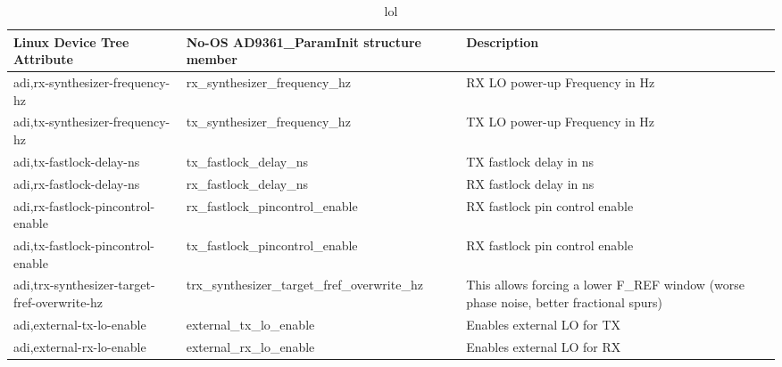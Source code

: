 \begin{table}[]
\centering
\begin{adjustbox}{width=1\textwidth}
\label{my-label}
\begin{tabular}{|l|l|l|}
\hline
\textbf{Linux Device Tree Attribute}         & \textbf{No-OS AD9361\_ParamInit structure member} & \textbf{Description}                                                                   \\ \hline
adi,rx-synthesizer-frequency-hz              & rx\_synthesizer\_frequency\_hz                    & RX LO power-up Frequency in Hz                                                         \\ \hline
adi,tx-synthesizer-frequency-hz              & tx\_synthesizer\_frequency\_hz                    & TX LO power-up Frequency in Hz                                                         \\ \hline
adi,tx-fastlock-delay-ns                     & tx\_fastlock\_delay\_ns                           & TX fastlock delay in ns                                                                \\ \hline
adi,rx-fastlock-delay-ns                     & rx\_fastlock\_delay\_ns                           & RX fastlock delay in ns                                                                \\ \hline
adi,rx-fastlock-pincontrol-enable            & rx\_fastlock\_pincontrol\_enable                  & RX fastlock pin control enable                                                         \\ \hline
adi,tx-fastlock-pincontrol-enable            & tx\_fastlock\_pincontrol\_enable                  & RX fastlock pin control enable                                                         \\ \hline
adi,trx-synthesizer-target-fref-overwrite-hz & trx\_synthesizer\_target\_fref\_overwrite\_hz     & This allows forcing a lower F\_REF window (worse phase noise, better fractional spurs) \\ \hline
adi,external-tx-lo-enable                    & external\_tx\_lo\_enable                          & Enables external LO for TX                                                             \\ \hline
adi,external-rx-lo-enable                    & external\_rx\_lo\_enable                          & Enables external LO for RX                                                             \\ \hline
\end{tabular}
\end{adjustbox}
\caption{lol}
\end{table}
